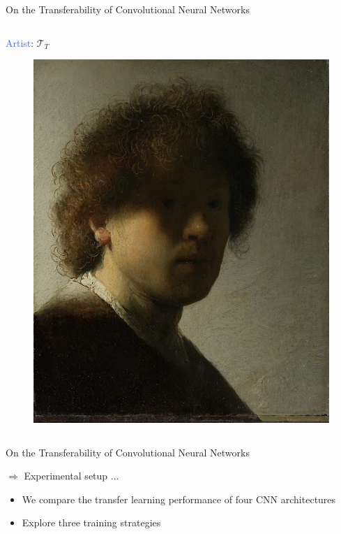 \documentclass{beamer}
\newcommand*\circled[1]{\tikz[baseline=(char.base)]{
            \node[shape=circle,draw,inner sep=0.5pt] (char) {#1};}}
\begin{document}
\begin{frame}{On the Transferability of Convolutional Neural Networks}
\begin{columns}
		\begin{column}{.3\textwidth}
			\textcolor{RoyalBlue}{Artist}: $\mathcal{T}_T$ \circled{3}
			\begin{figure}
				\includegraphics[width=1\textwidth]{figures/rembrandt}
			\end{figure}
		\end{column}
		
	\end{columns}

\end{frame}


\begin{frame}{On the Transferability of Convolutional Neural Networks}

	
	\bigskip
	$\Rightarrow$ Experimental setup ...
	\begin{itemize}
		\item We compare the transfer learning performance of four CNN architectures 
		\item Explore three training strategies
	\end{itemize}
\end{frame}
\end{document}
